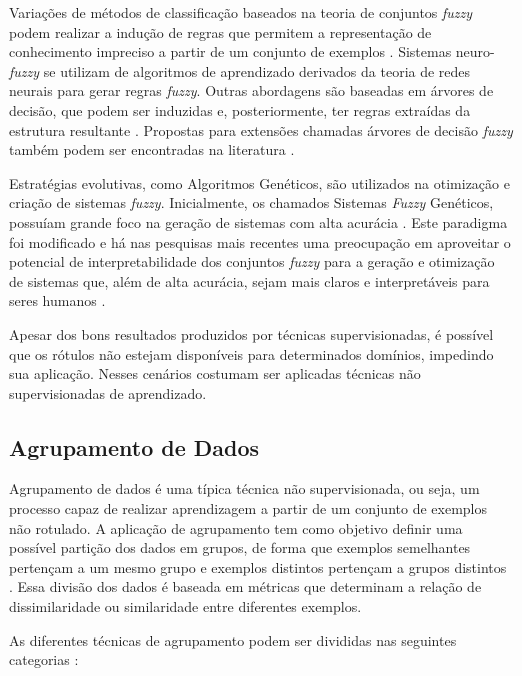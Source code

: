Variações de métodos de classificação baseados na teoria de conjuntos \emph{fuzzy} \cite{zadeh1965} podem realizar a indução de regras que permitem a representação de conhecimento impreciso a partir de um conjunto de exemplos \cite{pedrycz1998}. Sistemas neuro-\emph{fuzzy} \cite{klose2001} se utilizam de algoritmos de aprendizado derivados da teoria de redes neurais para gerar regras \emph{fuzzy}. Outras abordagens são baseadas em árvores de decisão, que podem ser induzidas e, posteriormente, ter regras extraídas da estrutura resultante \cite{quinlan1993}. Propostas para extensões chamadas árvores de decisão \emph{fuzzy} também podem ser encontradas na literatura \cite{janikow1998, cintra2012}.

Estratégias evolutivas, como Algoritmos Genéticos, são utilizados na otimização e criação de sistemas \emph{fuzzy}. Inicialmente, os chamados Sistemas \emph{Fuzzy} Genéticos, possuíam grande foco na geração de sistemas com alta acurácia \cite{Cordon2011}. Este paradigma foi modificado e há nas pesquisas mais recentes uma preocupação em aproveitar o potencial de interpretabilidade dos conjuntos \emph{fuzzy} para a geração e otimização de sistemas que, além de alta acurácia, sejam mais claros e interpretáveis para seres humanos \cite{Cordon2011, Fazzolari2013}.

Apesar dos bons resultados produzidos por técnicas supervisionadas, é possível que os rótulos não estejam disponíveis para determinados domínios, impedindo sua aplicação. Nesses cenários costumam ser aplicadas técnicas não supervisionadas de aprendizado.

\subsection{Agrupamento de Dados}

Agrupamento de dados é uma típica técnica não supervisionada, ou seja, um processo capaz de realizar aprendizagem a partir de um conjunto de exemplos não rotulado. A aplicação de agrupamento tem como objetivo definir uma possível partição dos dados em grupos, de forma que exemplos semelhantes pertençam a um mesmo grupo e exemplos distintos pertençam a grupos distintos \cite{jain1999}. Essa divisão dos dados é baseada em métricas que determinam a relação de dissimilaridade ou similaridade entre diferentes exemplos.

As diferentes técnicas de agrupamento podem ser divididas nas seguintes categorias \cite{han2012}:

